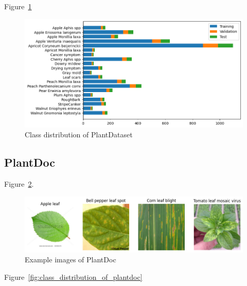 Figure~\ref{fig:class_distribution_of_plantdataset}

\begin{figure}[H]
    \begin{center}
    \includegraphics[width=15cm]{../images/class_distribution_of_plantdataset.png}
    \caption{Class distribution of PlantDataset}\label{fig:class_distribution_of_plantdataset}
    \end{center}
\end{figure}

\subsection{PlantDoc}
Figure~\ref{fig:example_images_of_plantdoc}.

\begin{figure}[H]
    \begin{center}
    \includegraphics[width=15cm]{../images/example_images_of_plantdoc.png}
    \caption{Example images of PlantDoc}\label{fig:example_images_of_plantdoc}
    \end{center}
\end{figure}

Figure~\ref{fig:class_distribution_of_plantdoc}

